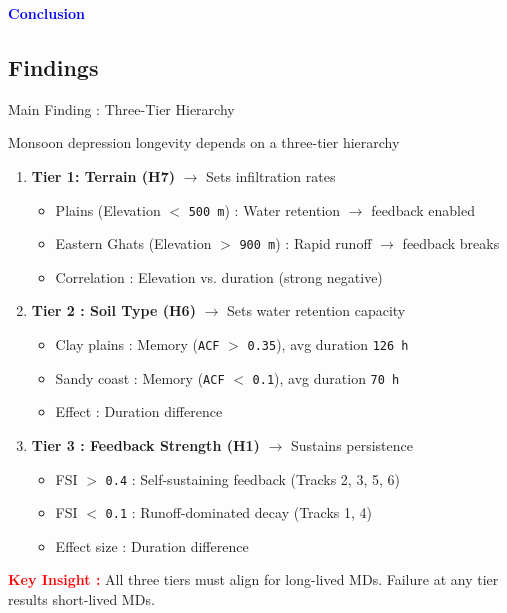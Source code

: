 \begin{frame}
	\begin{center}
		\Huge \textcolor{blue}{\textbf{Conclusion}} \\
	\end{center}
\end{frame}

\subsection{Findings}
\begin{frame}{Main Finding : Three-Tier Hierarchy}
	\vspace{-0.2cm}
	\begin{block}{Monsoon depression longevity depends on a three-tier hierarchy}\end{block}

	\vspace{0.15cm}
	\footnotesize
	\begin{enumerate}
		\footnotesize
		\item \textbf{Tier 1: Terrain (H7)} $\rightarrow$ Sets infiltration rates
		      \begin{itemize}\small
			      \item Plains (Elevation $<$ \texttt{500 m}) : Water retention $\rightarrow$ feedback enabled
			      \item Eastern Ghats (Elevation $>$ \texttt{900 m}) : Rapid runoff $\rightarrow$ feedback breaks
			      \item Correlation : Elevation vs. duration (strong negative)
		      \end{itemize}
		      \footnotesize
		\item \textbf{Tier 2 : Soil Type (H6)} $\rightarrow$ Sets water retention capacity
		      \begin{itemize}\small
			      \item Clay plains : Memory (\texttt{ACF} $>$ \texttt{0.35}), avg duration \texttt{126 h}
			      \item Sandy coast : Memory (\texttt{ACF} $<$ \texttt{0.1}), avg duration \texttt{70 h}
			      \item Effect : Duration difference
		      \end{itemize}
		      \footnotesize
		\item \textbf{Tier 3 : Feedback Strength (H1)} $\rightarrow$ Sustains persistence
		      \begin{itemize}\small
			      \item FSI $>$ \texttt{0.4} : Self-sustaining feedback (Tracks 2, 3, 5, 6)
			      \item FSI $<$ \texttt{0.1} : Runoff-dominated decay (Tracks 1, 4)
			      \item Effect size : Duration difference
		      \end{itemize}
	\end{enumerate}

	\vspace{0.08cm}
	\textbf{\textcolor{red}{Key Insight :}} All three tiers must align for long-lived MDs. Failure at any tier results short-lived MDs.
\end{frame}

